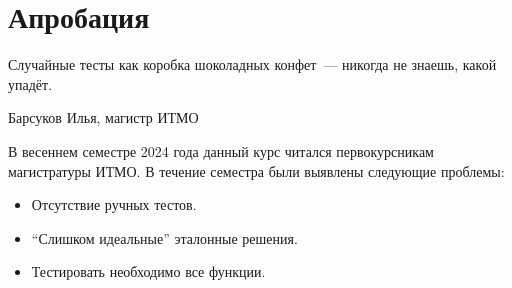 
\section{Апробация}

\epigraph{Случайные тесты как коробка шоколадных конфет~--- никогда не знаешь, какой упадёт.}{Барсуков Илья, магистр ИТМО}

В весеннем семестре 2024 года данный курс читался первокурсникам магистратуры ИТМО.
В течение семестра были выявлены следующие проблемы:
\begin{itemize}
    \item Отсутствие ручных тестов. 
    \item \enquote{Слишком идеальные} эталонные решения. 
    \item Тестировать необходимо все функции. 
\end{itemize}
